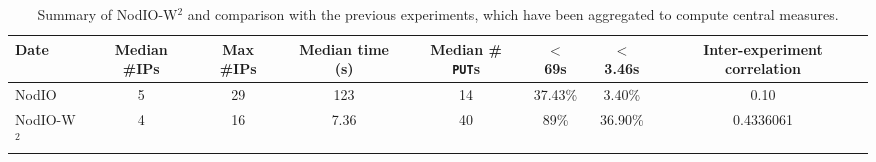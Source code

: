 \documentclass[journal,onecolumn]{IEEEtran}
\begin{document}
%
\begin{table}[!htb]
\caption{Summary of {\sf NodIO-W$^2$} and comparison with the previous
  experiments, which have been aggregated to compute central measures. \label{tab:summary:ww}}
\begin{center}
\begin{tabular}{l|ccccccc}
\hline
Date & Median \#IPs & Max \#IPs & Median time (s) & Median \#{\tt
  PUT}s & $<$ 69s & $<$ 3.46s & Inter-experiment correlation\\
\hline
{\sf NodIO} & 5 & 29 & 123 & 14 & 37.43\% & 3.40\% & 0.10 \\
{\sf NodIO-W$^2$} & 4  & 16 & 7.36 & 40 & 89\% & 36.90\% & 0.4336061 \\
\hline
\end{tabular}
\end{center}
\end{table}
\end{document}

